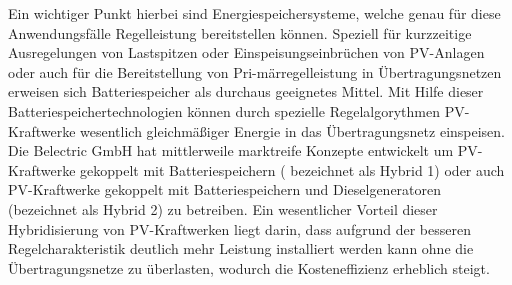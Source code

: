Ein wichtiger Punkt hierbei sind Energiespeichersysteme, welche genau für diese Anwendungsfälle Regelleistung bereitstellen können. Speziell für kurzzeitige Ausregelungen von Lastspitzen oder Einspeisungseinbrüchen von PV-Anlagen oder auch für die Bereitstellung von Pri-märregelleistung in Übertragungsnetzen erweisen sich Batteriespeicher als durchaus geeignetes Mittel. Mit Hilfe dieser Batteriespeichertechnologien können durch spezielle Regelalgorythmen PV-Kraftwerke wesentlich gleichmäßiger Energie in das Übertragungsnetz einspeisen. Die Belectric GmbH hat mittlerweile marktreife Konzepte entwickelt um PV-Kraftwerke gekoppelt mit Batteriespeichern ( bezeichnet als Hybrid 1) oder auch PV-Kraftwerke gekoppelt mit Batteriespeichern und Dieselgeneratoren (bezeichnet als Hybrid 2) zu betreiben. Ein wesentlicher Vorteil dieser Hybridisierung von PV-Kraftwerken liegt darin, dass aufgrund der besseren Regelcharakteristik deutlich mehr Leistung installiert werden kann ohne die Übertragungsnetze zu überlasten, wodurch die Kosteneffizienz erheblich steigt.  




